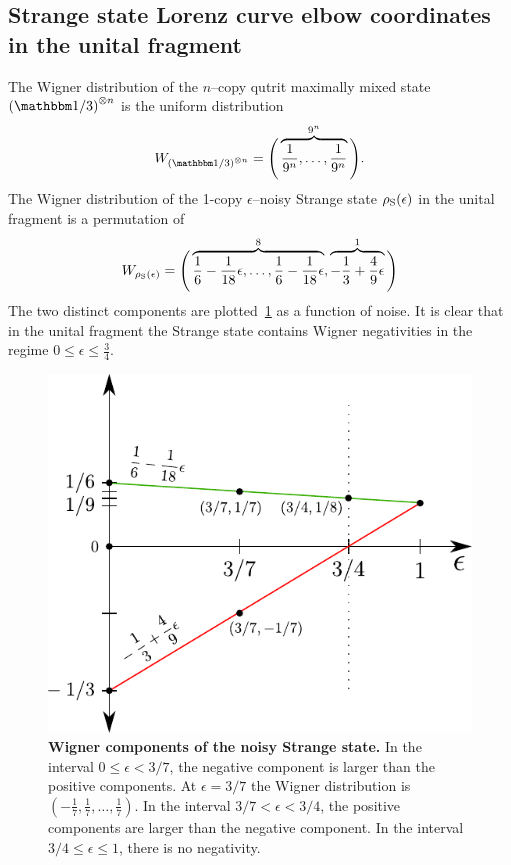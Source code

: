 \subsection{Strange state Lorenz curve elbow coordinates in the unital fragment}\label{app:lcsu_coord_elb}
The Wigner distribution of the $n$--copy qutrit maximally mixed state $\left(\id/3\right)^{\otimes n}$ is the uniform distribution 
\begin{equation}\label{eq:wu}
	\W{\left(\id/3\right)^{\otimes n}} = \Bigg( \overbrace{\frac{1}{9^n}, \dots, \frac{1}{9^n}}^{9^n} \Bigg).
\end{equation}
The Wigner distribution of the 1-copy $\epsilon$--noisy Strange state $\rho_{\rm{S}}(\epsilon)$ in the unital fragment is a permutation of 
\begin{equation}\label{eq:wsu}
	\W{\rho_{\rm{S}}(\epsilon)} = \Bigg( \overbrace{\frac{1}{6} - \frac{1}{18}\epsilon, \dots, \frac{1}{6} - \frac{1}{18}\epsilon}^8, \overbrace{-\frac{1}{3} + \frac{4}{9}\epsilon}^1 \Bigg)
\end{equation}
The two distinct components are plotted~\cref{fig:noisys} as a function of noise. 
It is clear that in the unital fragment the Strange state contains Wigner negativities in the regime $0 \leq \epsilon \leq \tfrac{3}{4}$.
\begin{figure}[h]
    \centering
    \includegraphics[scale=0.7]{figs/noisys.pdf}
    \caption{\textbf{Wigner components of the noisy Strange state.} 
    In the interval $0 \leq \epsilon < 3/7$, the negative component is larger than the positive components.
    At $\epsilon = 3/7$ the Wigner distribution is $(-\frac{1}{7},\frac{1}{7},\dots,\frac{1}{7})$.
    In the interval $3/7 < \epsilon < 3/4$, the positive components are larger than the negative component.
    In the interval $3/4 \leq \epsilon \leq 1$, there is no negativity.
    }
    \label{fig:noisys}
\end{figure}

